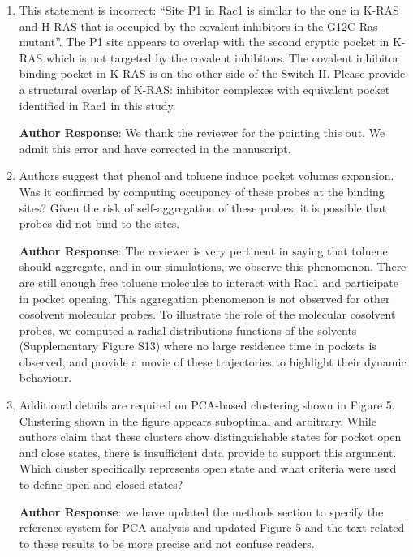 \documentclass[11pt, a4paper]{article}
\begin{document}
\begin{enumerate}
\textbf{Author Response}: Is it better with backbone RMSF? Otherwise, lighten the text : use "seems to be linked", instead of "As we have already established".

    \item This statement is incorrect: “Site P1 in Rac1 is similar to the one in K-RAS and H-RAS that is occupied by the covalent inhibitors in the G12C Ras mutant”. The P1 site appears to overlap with the second cryptic pocket in K-RAS which is not targeted by the covalent inhibitors. The covalent inhibitor binding pocket in K-RAS is on the other side of the Switch-II. Please provide a structural overlap of K-RAS: inhibitor complexes with equivalent pocket identified in Rac1 in this study.

\textbf{Author Response}: We thank the reviewer for the pointing this out. We admit this error and have corrected in the manuscript.
    
    \item Authors suggest that phenol and toluene induce pocket volumes expansion. Was it confirmed by computing occupancy of these probes at the binding sites? Given the risk of self-aggregation of these probes, it is possible that probes did not bind to the sites.

\textbf{Author Response}: The reviewer is very pertinent in saying that toluene should aggregate, and in our simulations, we observe this phenomenon. There are still enough free toluene molecules to interact with Rac1 and participate in pocket opening. This aggregation phenomenon is not observed for other cosolvent molecular probes. To illustrate the role of the molecular cosolvent probes, we computed a radial distributions functions of the solvents (Supplementary Figure S13) where no large residence time in pockets is observed, and provide a movie of these trajectories to highlight their dynamic behaviour.

    \item Additional details are required on PCA-based clustering shown in Figure 5. Clustering shown in the figure appears suboptimal and arbitrary. While authors claim that these clusters show distinguishable states for pocket open and close states, there is insufficient data provide to support this argument. Which cluster specifically represents open state and what criteria were used to define open and closed states?

\textbf{Author Response}: we have updated the methods section to specify the reference system for PCA analysis and updated Figure 5 and the text related to these results to be more precise and not confuse readers.


\end{enumerate}
\end{document}
